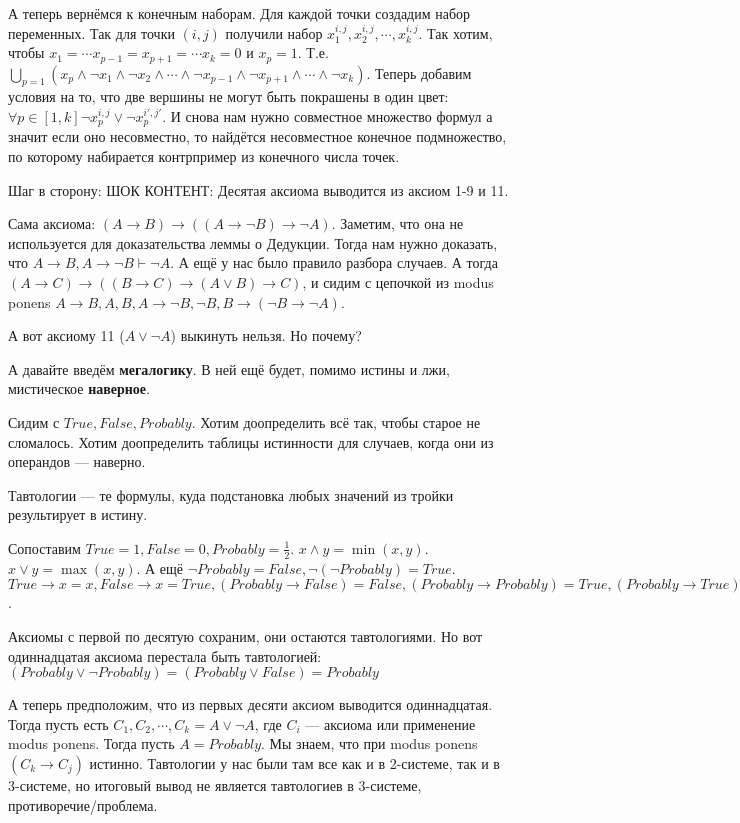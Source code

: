 А теперь вернёмся к конечным наборам. Для каждой точки создадим набор переменных. Так для точки $(i, j)$ получили набор $x_1^{i, j}, x_2^{i, j}, \cdots, x_k^{i, j}$. Так хотим, чтобы $x_1 = \cdots x_{p-1} = x_{p+1} = \cdots x_k = 0$ и $x_p = 1$. Т.е. $\bigcup_{p=1} (x_p \land \lnot x_1 \land \lnot x_2 \land \cdots \land \lnot x_{p-1} \land \lnot x_{p+1} \land \cdots \land \lnot x_k)$. Теперь добавим условия на то, что две вершины не могут быть покрашены в один цвет: $\forall p \in [1, k] \lnot x_p^{i, j} \lor \lnot x_p^{i', j'}$. И снова нам нужно совместное множество формул а значит если оно несовместно, то найдётся несовместное конечное подмножество, по которому набирается контрпример из конечного числа точек.

Шаг в сторону: ШОК КОНТЕНТ: Десятая аксиома выводится из аксиом 1-9 и 11.

Сама аксиома: $(A \to B) \to ((A \to \lnot B) \to \lnot A)$. Заметим, что она не используется для доказательства леммы о Дедукции. Тогда нам нужно доказать, что $A \to B, A \to \lnot B \vdash \lnot A$. А ещё у нас было правило разбора случаев. А тогда $(A \to C) \to ((B \to C) \to (A \lor B) \to C)$, и сидим с цепочкой из modus ponens $A \to B, A, B, A \to \lnot B, \lnot B, B \to (\lnot B \to \lnot A)$. 

А вот аксиому 11 ($A \lor \lnot A$) выкинуть нельзя. Но почему?

А давайте введём \textbf{мегалогику}. В ней ещё будет, помимо истины и лжи, мистическое \textbf{наверное}. 

Сидим с $True, False, Probably$. Хотим доопределить всё так, чтобы старое не сломалось. Хотим доопределить таблицы истинности для случаев, когда они из операндов --- наверно.

Тавтологии --- те формулы, куда подстановка любых значений из тройки результирует в истину. 

Сопоставим $True = 1, False = 0, Probably = \frac12$. $x \land y = \min(x, y)$. $x \lor y = \max(x, y)$. А ещё $\lnot Probably = False, \lnot(\lnot Probably) = True$. $True \to x = x, False \to x = True, (Probably \to False) = False, (Probably \to Probably) = True, (Probably \to True) = True$.

Аксиомы с первой по десятую сохраним, они остаются тавтологиями. Но вот одиннадцатая аксиома перестала быть тавтологией: $(Probably \lor \lnot Probably) = (Probably \lor False) = Probably$

А теперь предположим, что из первых десяти аксиом выводится одиннадцатая. Тогда пусть есть $C_1, C_2, \cdots, C_k = A \lor \lnot A$, где $C_i$ --- аксиома или применение modus ponens. Тогда пусть $A = Probably$. Мы знаем, что при modus ponens $(C_k \to C_j)$ истинно. Тавтологии у нас были там все как и в 2-системе, так и в 3-системе, но итоговый вывод не является тавтологиев в 3-системе, противоречие/проблема. 

